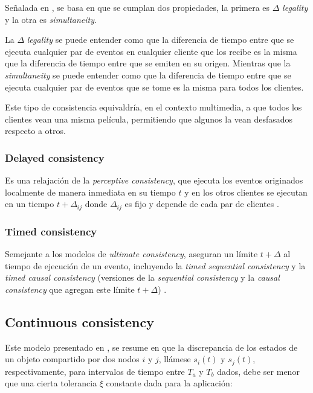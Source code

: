 Señalada en \cite{bouillot2005fast}, se basa en que se cumplan dos propiedades, la primera es $\Delta$ \emph{legality} y la otra es \emph{simultaneity}.

La $\Delta$ \emph{legality} se puede entender como que la diferencia de tiempo entre que se ejecuta cualquier par de eventos en cualquier cliente que los recibe es la misma que la diferencia de tiempo entre que se emiten en su origen. Mientras que la \emph{simultaneity} se puede entender como que la diferencia de tiempo entre que se ejecuta cualquier par de eventos que se tome es la misma para todos los clientes.

Este tipo de consistencia equivaldría, en el contexto multimedia, a que todos los clientes vean una misma película, permitiendo que algunos la vean desfasados respecto a otros.

\subsubsection{Delayed consistency}

Es una relajación de la \emph{perceptive consistency}, que ejecuta los eventos originados localmente de manera inmediata en su tiempo $t$ y en los otros clientes se ejecutan en un tiempo $t+\Delta_{ij}$ donde $\Delta_{ij}$ es fijo y depende de cada par de clientes \cite{qin2002delayed}.

\subsubsection{Timed consistency}

Semejante a los modelos de \emph{ultimate consistency}, aseguran un límite $t+\Delta$ al tiempo de ejecución de un evento, incluyendo la \emph{timed sequential consistency} y la \emph{timed causal consistency} (versiones de la \emph{sequential consistency} y la \emph{causal consistency} que agregan este límite $t+\Delta$) \cite{torres1999timed}.

\subsection{Continuous consistency}

Este modelo presentado en \cite{li2004supporting}, se resume en que la discrepancia de los estados de un objeto compartido por dos nodos $i$ y $j$, llámese $s_i(t)$ y $s_j(t)$, respectivamente, para intervalos de tiempo entre $T_a$ y $T_b$ dados, debe ser menor que una cierta tolerancia $\xi$ constante dada para la aplicación:

